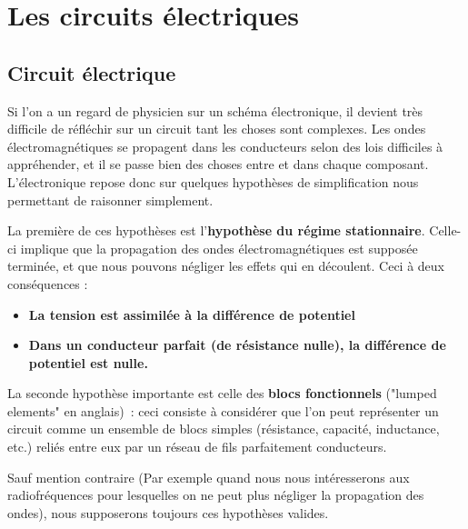 \chapter{Les circuits électriques}

\section{Circuit électrique}


Si l'on a un regard de physicien sur un schéma électronique, il devient très difficile de réfléchir sur un circuit tant les choses sont complexes. Les ondes électromagnétiques se propagent dans les conducteurs selon des lois difficiles à appréhender, et il se passe bien des choses entre et dans chaque composant. L'électronique repose donc sur quelques hypothèses de simplification nous permettant de raisonner simplement.  

La première de ces hypothèses est l'\textbf{hypothèse du régime stationnaire}. Celle-ci implique que la propagation des ondes électromagnétiques est supposée terminée, et que nous pouvons négliger les effets qui en découlent. Ceci à deux conséquences : 

\begin{itemize}
\item \textbf{La tension est assimilée à la différence de potentiel} \\
\item \textbf{Dans un conducteur parfait (de résistance nulle), la différence de potentiel est nulle.}
\end{itemize}

La seconde hypothèse importante est celle des \textbf{blocs fonctionnels} ("lumped elements" en anglais)~: ceci consiste à considérer que l'on peut représenter un circuit comme un ensemble de blocs simples (résistance, capacité, inductance, etc.) reliés entre eux par un réseau de fils parfaitement conducteurs.

Sauf mention contraire (Par exemple quand nous nous intéresserons aux radiofréquences pour lesquelles on ne peut plus négliger la propagation des ondes), nous supposerons toujours ces hypothèses valides.

